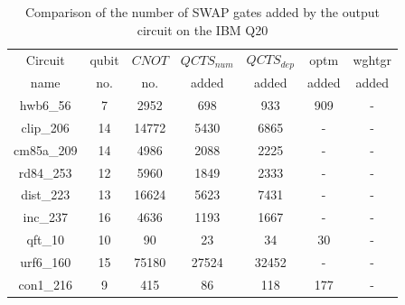 \documentclass[runningheads]{llncs}
\begin{document}
				\begin{table}[H]
					\label{tab5}
					\begin{center}  
					\begin{tabular}{|c|c|c|c|c|c|c|}
					\hline
					Circuit &  qubit  & $CNOT$ &$QCTS_{num}$& $QCTS_{dep}$  & optm 	 & wghtgr 	\\
					 name	&   no. 	&	no. & added&  added &  added 	&  added\\
					\hline
					hwb6\_56 & 7 & 2952 & 698 & 933 & 909 & - \\ 
clip\_206 & 14 & 14772 & 5430 & 6865 & - & - \\ 
cm85a\_209 & 14 & 4986 & 2088 & 2225 & - & - \\ 
rd84\_253 & 12 & 5960 & 1849 & 2333 & - & - \\ 
dist\_223 & 13 & 16624 & 5623 & 7431 & - & - \\ 
inc\_237 & 16 & 4636 & 1193 & 1667 & - & - \\ 
qft\_10 & 10 & 90 & 23 & 34 & 30 & - \\ 
urf6\_160 & 15 & 75180 & 27524 & 32452 & - & - \\ 
con1\_216 & 9 & 415 & 86 & 118 & 177 & - \\ 
					\hline
					\end{tabular} 
					\end{center}	
					\caption{Comparison of  the number of  SWAP gates added by the 
					output circuit on the IBM Q20 }  
					\label{tab5}
					\end{table}
\end{document}

